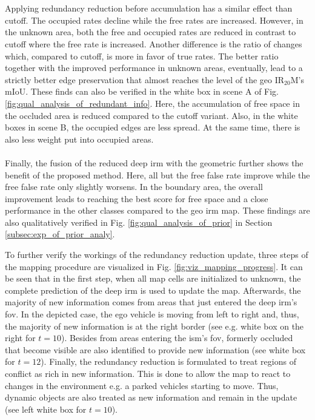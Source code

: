 \\\\
Applying redundancy reduction before accumulation has a similar effect than cutoff. The occupied rates decline while the free rates are increased. However, in the unknown area, both the free and occupied rates are reduced in contrast to cutoff where the free rate is increased. Another difference is the ratio of changes which, compared to cutoff, is more in favor of true rates. The better ratio together with the improved performance in unknown areas, eventually, lead to a strictly better edge preservation that almost reaches the level of the geo IR$_{20}$M's mIoU. These finds can also be verified in the white box in scene A of Fig. \ref{fig:qual_analysis_of_redundant_info}. Here, the accumulation of free space in the occluded area is reduced compared to the cutoff variant. Also, in the white boxes in scene B, the occupied edges are less spread. At the same time, there is also less weight put into occupied areas.
\\\\
Finally, the fusion of the reduced deep \gls{irm} with the geometric further shows the benefit of the proposed method. Here, all but the free false rate improve while the free false rate only slightly worsens. In the boundary area, the overall improvement leads to reaching the best score for free space and a close performance in the other classes compared to the geo \gls{irm} map. These findings are also qualitatively verified in Fig. \ref{fig:qual_analysis_of_prior} in Section \ref{subsec:exp_of_prior_analy}.
\begin{center}
\end{center}
To further verify the workings of the redundancy reduction update, three steps of the mapping procedure are visualized in Fig. \ref{fig:viz_mapping_progress}. It can be seen that in the first step, when all map cells are initialized to unknown, the complete prediction of the deep \gls{irm} is used to update the map. Afterwards, the majority of new information comes from areas that just entered the deep \gls{irm}'s \gls{fov}. In the depicted case, the ego vehicle is moving from left to right and, thus, the majority of new information is at the right border (see e.g. white box on the right for $t=10$). Besides from areas entering the \gls{ism}'s \gls{fov}, formerly occluded that become visible are also identified to provide new information (see white box for $t=12$). Finally, the redundancy reduction is formulated to treat regions of conflict as rich in new information. This is done to allow the map to react to changes in the environment e.g. a parked vehicles starting to move. Thus, dynamic objects are also treated as new information and remain in the update (see left white box for $t=10$).

